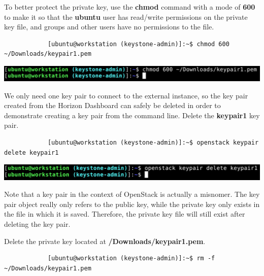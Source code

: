 \documentclass[letterpaper, 12pt]{article}
\begin{document}
\begin{enumerate}
    \begin{labstep}
        To better protect the private key, use the \textbf{chmod} command with a mode of \textbf{600} to make it so that the \textbf{ubuntu} user has read/write permissions on the private key file, and groups and other users have no permissions to the file.
        \begin{lstlisting}
            [ubuntu@workstation (keystone-admin)]:~$ chmod 600 ~/Downloads/keypair1.pem
        \end{lstlisting}

        \begin{center}
            \includegraphics[width=\linewidth]{images/part3/step6.png}
        \end{center}
    \end{labstep}

    \begin{labstep}
        We only need one key pair to connect to the external instance, so the key pair created from the Horizon Dashboard can safely be deleted in order to demonstrate creating a key pair from the command line.
        Delete the \textbf{keypair1} key pair.
        \begin{lstlisting}
            [ubuntu@workstation (keystone-admin)]:~$ openstack keypair delete keypair1
        \end{lstlisting}

        \begin{center}
            \includegraphics[width=\linewidth]{images/part3/step7.png}
        \end{center}
    \end{labstep}

    \begin{notebox}
        Note that a key pair in the context of OpenStack is actually a misnomer.
        The key pair object really only refers to the public key, while the private key only exists in the file in which it is saved.
        Therefore, the private key file will still exist after deleting the key pair.
    \end{notebox}

    \begin{labstep}
        Delete the private key located at \textbf{\texttildemid/Downloads/keypair1.pem}.
        \begin{lstlisting}
            [ubuntu@workstation (keystone-admin)]:~$ rm -f ~/Downloads/keypair1.pem
        \end{lstlisting}


\end{labstep}
\end{enumerate}
\end{document}

